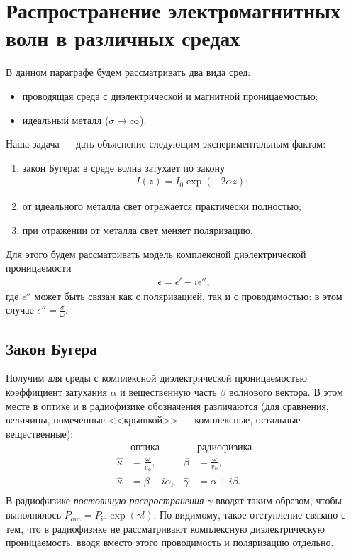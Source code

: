 \section{Распространение электромагнитных волн в различных средах}
В данном параграфе будем рассматривать два вида сред:
\begin{itemize}
  \item проводящая среда с диэлектрической и магнитной проницаемостью;
  \item идеальный металл (\(\sigma \to \infty\)).
\end{itemize}

Наша задача --- дать объяснение следующим экспериментальным фактам:
\begin{enumerate}
  \item закон Бугера: в среде волна затухает по закону
  \begin{align*}
    I(z) = I_0\exp(-2\alpha z);
  \end{align*}
  \item от идеального металла свет отражается практически полностью;
  \item при отражении от металла свет меняет поляризацию.
\end{enumerate}

Для этого будем рассматривать модель комплексной диэлектрической проницаемости
\begin{align*}
  \epsilon = \epsilon' - i\epsilon'',
\end{align*}
где \(\epsilon''\) может быть связан как с поляризацией, так и с проводимостью:
в этом случае \(\epsilon'' = \frac{\sigma}{\omega}\).

\subsection{Закон Бугера}
Получим для среды с комплексной диэлектрической проницаемостью коэффициент
затухания \(\alpha\) и вещественную часть \(\beta\) волнового вектора.
В этом месте в оптике и в радиофизике обозначения различаются (для сравнения,
величины, помеченные <<крышкой>> --- комплексные, остальные --- вещественные):
\begin{align*}
  &\text{оптика}&
  &\text{радиофизика}\\
  \hat{\kappa} &= \frac{\omega}{\hat{v}_{\phi}}, &
  \beta &= \frac{\omega}{v_{\phi}}, \\
  \hat{\kappa} &= \beta - i\alpha, &
  \hat{\gamma} &= \alpha + i\beta. \\
\end{align*}
В радиофизике \emph{постоянную распространения} \(\gamma\) вводят таким образом,
чтобы выполнялось \(P_{\text{out}} = P_{\text{in}}\exp(\gamma l)\). По-видимому,
такое отступление связано с тем, что в радиофизике не рассматривают комплексную
диэлектрическую проницаемость, вводя вместо этого проводимость и поляризацию
отдельно.

